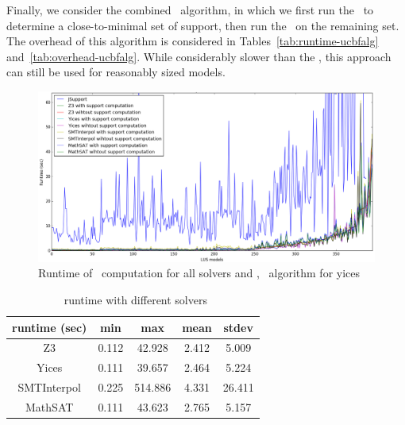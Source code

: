 
Finally, we consider the combined \ucbfalg\ algorithm, in which we first run the \ucalg\ to determine a close-to-minimal set of support, then run the \bfalg\ on the remaining set.  The overhead of this algorithm is considered in Tables~\ref{tab:runtime-ucbfalg} and~\ref{tab:overhead-ucbfalg}.  While considerably slower than the \ucalg, this approach can still be used for reasonably sized models.

\begin{figure}
  \centering
  \includegraphics[width=\textwidth]{figs/runtimeAll.png}
  \caption{Runtime of \ucalg\ computation for all solvers and \bfalg, \ucbfalg\ algorithm for yices}\label{fig:runtimeall}
\end{figure}


\begin{table}
  \centering
  \begin{tabular}{ |c||c|c|c|c| }
    \hline
     runtime (sec) & min & max & mean & stdev \\[0.5ex]
    \hline\hline
    Z3   & 0.112 & 42.928 & 2.412 & 5.009 \\[0.5ex]
    Yices &   0.111  & 39.657   & 2.464 & 5.224 \\[0.5ex]
    SMTInterpol& 0.225 & 514.886 &  4.331 & 26.411 \\[0.5ex]
    MathSAT & 0.111 & 43.623 &  2.765 & 5.157 \\[0.5ex]
    \hline
  \end{tabular} \\ 
  \caption{\ucalg\ runtime with different solvers}
  \label{tab:runtime-ucalg}
\end{table}

